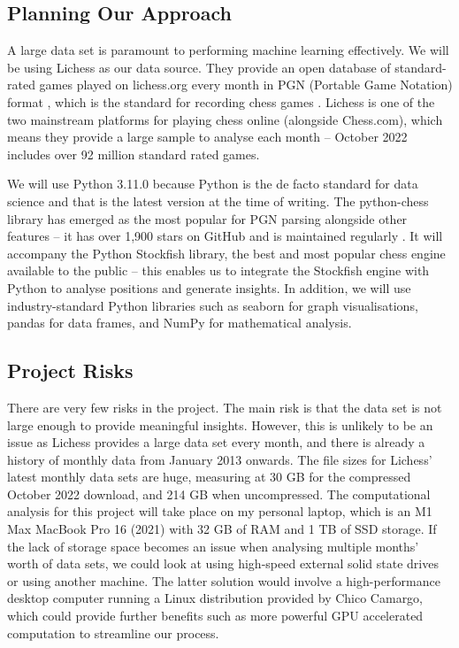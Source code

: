 \documentclass[%
 superscriptaddress,
showpacs,preprintnumbers,
 amsmath,
 amssymb,
 aps,
 pra,
showkeys,
onecolumn,
notitlepage,
11pt,
tightenlines      %
]{revtex4-1}
\begin{document}
\subsection{Planning Our Approach}
A large data set is paramount to performing machine learning effectively. We will be using Lichess as our data source. They provide an open database of standard-rated games played on lichess.org every month in PGN (Portable Game Notation) format \cite{lichessOpenDatabase}, which is the standard for recording chess games \cite{pgnExplanation}. Lichess is one of the two mainstream platforms for playing chess online (alongside Chess.com), which means they provide a large sample to analyse each month -- October 2022 includes over 92 million standard rated games.

We will use Python 3.11.0 because Python is the de facto standard for data science \cite{pythonForDataScience} and that is the latest version at the time of writing. The python-chess library has emerged as the most popular for PGN parsing alongside other features -- it has over 1,900 stars on GitHub and is maintained regularly \cite{pythonChessLibrary}. It will accompany the Python Stockfish library, the best and most popular chess engine available to the public \cite{aboutStockfish} -- this enables us to integrate the Stockfish engine with Python to analyse positions and generate insights. In addition, we will use industry-standard Python libraries such as seaborn for graph visualisations, pandas for data frames, and NumPy for mathematical analysis.

\subsection{Project Risks}
There are very few risks in the project. The main risk is that the data set is not large enough to provide meaningful insights. However, this is unlikely to be an issue as Lichess provides a large data set every month, and there is already a history of monthly data from January 2013 onwards. The file sizes for Lichess' latest monthly data sets are huge, measuring at 30 GB for the compressed October 2022 download, and 214 GB when uncompressed. The computational analysis for this project will take place on my personal laptop, which is an M1 Max MacBook Pro 16 (2021) with 32 GB of RAM and 1 TB of SSD storage. If the lack of storage space becomes an issue when analysing multiple months' worth of data sets, we could look at using high-speed external solid state drives or using another machine. The latter solution would involve a high-performance desktop computer running a Linux distribution provided by Chico Camargo, which could provide further benefits such as more powerful GPU accelerated computation to streamline our process.
\end{document}
